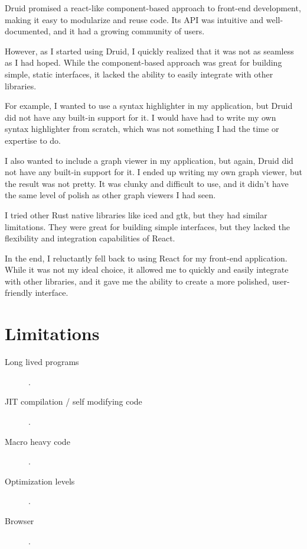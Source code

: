 Druid promised a react-like component-based approach to front-end development, making it easy to modularize and reuse code. Its API was intuitive and well-documented, and it had a growing community of users.

However, as I started using Druid, I quickly realized that it was not as seamless as I had hoped. While the component-based approach was great for building simple, static interfaces, it lacked the ability to easily integrate with other libraries.

For example, I wanted to use a syntax highlighter in my application, but Druid did not have any built-in support for it. I would have had to write my own syntax highlighter from scratch, which was not something I had the time or expertise to do.

I also wanted to include a graph viewer in my application, but again, Druid did not have any built-in support for it. I ended up writing my own graph viewer, but the result was not pretty. It was clunky and difficult to use, and it didn't have the same level of polish as other graph viewers I had seen.

I tried other Rust native libraries like iced and gtk, but they had similar limitations. They were great for building simple interfaces, but they lacked the flexibility and integration capabilities of React.

In the end, I reluctantly fell back to using React for my front-end application. While it was not my ideal choice, it allowed me to quickly and easily integrate with other libraries, and it gave me the ability to create a more polished, user-friendly interface.



\section{Limitations}
\begin{description}
\item[Long lived programs] .
\item[JIT compilation / self modifying code] .
\item[Macro heavy code] .
\item[Optimization levels] .
\item[Browser] .

\end{description}
